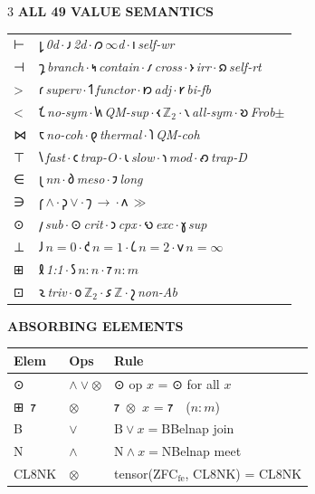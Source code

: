 \documentclass[7pt]{article}
\renewcommand{\arraystretch}{0.85}
\newcommand{\shead}[1]{%
  \vspace{2pt}%
  {\fontsize{6pt}{6.5pt}\selectfont\sffamily\bfseries\textcolor{hd}{\MakeUppercase{#1}}}%
  \vspace{0.3pt}\newline{\color{rl}\hrule height 0.2pt}\vspace{1pt}%
}
\newcommand{\sh}[1]{{\Large\shavfont #1}}
\newcommand{\prim}[1]{{\Large\igprimfont #1}}
\begin{document}
\begin{multicols}{3}
\vspace{1pt}
\shead{All 49 Value Semantics}
{\fontsize{5.8pt}{6.8pt}\selectfont
\renewcommand{\arraystretch}{0.85}
\begin{tabular}{@{}l@{\,}p{63mm}@{}}
\prim{⊢} & \sh{𐑛}\,\textit{0d}\,$\cdot$\,\sh{𐑨}\,\textit{2d}\,$\cdot$\,\sh{𐑼}\,\textit{$\infty$d}\,$\cdot$\,\sh{𐑦}\,\textit{self-wr} \\
\prim{⊣} & \sh{𐑡}\,\textit{branch}\,$\cdot$\,\sh{𐑰}\,\textit{contain}\,$\cdot$\,\sh{𐑥}\,\textit{cross}\,$\cdot$\,\sh{𐑶}\,\textit{irr}\,$\cdot$\,\sh{𐑸}\,\textit{self-rt} \\
\prim{>} & \sh{𐑩}\,\textit{superv}\,$\cdot$\,\sh{𐑑}\,\textit{functor}\,$\cdot$\,\sh{𐑽}\,\textit{adj}\,$\cdot$\,\sh{𐑾}\,\textit{bi-fb} \\
\prim{<} & \sh{𐑗}\,\textit{no-sym}\,$\cdot$\,\sh{𐑿}\,\textit{QM-sup}\,$\cdot$\,\sh{𐑬}\,\textit{$\mathbb{Z}_2$}\,$\cdot$\,\sh{𐑯}\,\textit{all-sym}\,$\cdot$\,\sh{𐑹}\,\textit{Frob$\pm$} \\
\prim{⋈} & \sh{𐑱}\,\textit{no-coh}\,$\cdot$\,\sh{𐑞}\,\textit{thermal}\,$\cdot$\,\sh{𐑐}\,\textit{QM-coh} \\
\prim{⊤} & \sh{𐑘}\,\textit{fast}\,$\cdot$\,\sh{𐑤}\,\textit{trap-O}\,$\cdot$\,\sh{𐑧}\,\textit{slow}\,$\cdot$\,\sh{𐑪}\,\textit{mod}\,$\cdot$\,\sh{𐑺}\,\textit{trap-D} \\
\prim{∈} & \sh{𐑚}\,\textit{nn}\,$\cdot$\,\sh{𐑔}\,\textit{meso}\,$\cdot$\,\sh{𐑲}\,\textit{long} \\
\prim{∋} & \sh{𐑝}\,$\wedge$\,$\cdot$\,\sh{𐑜}\,$\vee$\,$\cdot$\,\sh{𐑠}\,$\to$\,$\cdot$\,\sh{𐑵}\,$\gg$ \\
\prim{⊙} & \sh{𐑢}\,\textit{sub}\,$\cdot$\,{\Large⊙}\,\textit{crit}\,$\cdot$\,\sh{𐑮}\,\textit{cpx}\,$\cdot$\,\sh{𐑻}\,\textit{exc}\,$\cdot$\,\sh{𐑣}\,\textit{sup} \\
\prim{⊥} & \sh{𐑓}\,$n=0$\,$\cdot$\,\sh{𐑒}\,$n=1$\,$\cdot$\,\sh{𐑖}\,$n=2$\,$\cdot$\,\sh{𐑫}\,$n=\infty$ \\
\prim{⊞} & \sh{𐑙}\,\textit{1:1}\,$\cdot$\,\sh{𐑕}\,$n:n$\,$\cdot$\,\sh{𐑳}\,$n:m$ \\
\prim{⊡} & \sh{𐑷}\,\textit{triv}\,$\cdot$\,\sh{𐑴}\,$\mathbb{Z}_2$\,$\cdot$\,\sh{𐑭}\,$\mathbb{Z}$\,$\cdot$\,\sh{𐑟}\,\textit{non-Ab} \\
\end{tabular}
}

\vspace{1pt}
\shead{Absorbing Elements}
{\fontsize{6.5pt}{7.8pt}\selectfont
\begin{tabular}{@{}l@{\;}l@{\;}p{44mm}@{}}
\toprule
\textbf{Elem} & \textbf{Ops} & \textbf{Rule} \\
\midrule
\sh{⊙} & $\wedge\vee\otimes$ & \sh{⊙} op $x$ = \sh{⊙} for all $x$ \\
\sh{⊞}~\sh{𐑳} & $\otimes$ & \sh{𐑳}~$\otimes$~$x$ = \sh{𐑳}~~($n:m$) \\
B & $\vee$ & $\mathrm{B}\vee x = \mathrm{B}$\enspace Belnap join \\
N & $\wedge$ & $\mathrm{N}\wedge x = \mathrm{N}$\enspace Belnap meet \\
CL8NK & $\otimes$ & tensor(ZFC$_\mathrm{fe}$, CL8NK) = CL8NK \\
\bottomrule
\end{tabular}
}


\end{multicols}
\end{document}
